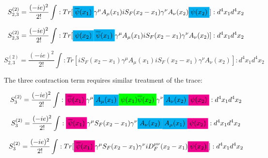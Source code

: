 \documentclass[a4]{article}
\newcommand{\highlight}[2][yellow]{\mathchoice
  {\colorbox{#1}{$\displaystyle#2$}}
  {\colorbox{#1}{$\textstyle#2$}}
  {\colorbox{#1}{$\scriptstyle#2$}}
  {\colorbox{#1}{$\scriptscriptstyle#2$}}}
\begin{document}
        \begin{equation}
            S^{(2)}_{2,3} = \frac{(-ie)^2}{2!} \int :Tr[\highlight[cyan]{\overline{\psi} (x_1)} \gamma^{\mu} A_{\mu} (x_1) i S_{F} (x_2 - x_1) \gamma^{\nu} A_{\nu} (x_2)  \highlight[cyan]{\psi (x_2)}]: d^{4} x_{1} d^{4} x_{2}
        \end{equation}

        \begin{equation}
            S^{(2)}_{2,3} = \frac{(-ie)^2}{2!} \int :Tr[ \highlight[cyan]{\psi (x_2)} \highlight[cyan]{\overline{\psi} (x_1)} \gamma^{\mu} A_{\mu} (x_1) i S_{F} (x_2 - x_1) \gamma^{\nu} A_{\nu} (x_2)]: d^{4} x_{1} d^{4} x_{2}
        \end{equation}

        \begin{framed}
            \begin{equation}
                S^{(2)}_{2,3} = \frac{(-ie)^2}{2!} \int :Tr[ i S_{F} (x_2 - x_1) \gamma^{\mu} A_{\mu} (x_1) i S_{F} (x_2 - x_1) \gamma^{\nu} A_{\nu} (x_2)]: d^{4} x_{1} d^{4} x_{2}
            \end{equation}
        \end{framed}

        The three contraction term requires similar treatment of the trace:

        \begin{equation}
            S^{(2)}_{3} = \frac{(-ie)^2}{2!} \int :\highlight[magenta]{\overline{\psi} (x_1)} \gamma^{\mu} \highlight[cyan]{A_{\mu} (x_1)} \highlight[green]{\psi (x_1) \overline{\psi} (x_2)} \gamma^{\nu} \highlight[cyan]{A_{\nu} (x_2)} \highlight[magenta]{\psi (x_2)}: d^{4} x_{1} d^{4} x_{2}
        \end{equation}

        \begin{equation}
            S^{(2)}_{3} = \frac{(-ie)^2}{2!} \int :\highlight[magenta]{\overline{\psi} (x_1)} \gamma^{\mu} S_{F} (x_2 - x_1) \gamma^{\nu} \highlight[cyan]{A_{\nu} (x_2)} \highlight[cyan]{A_{\mu} (x_1)} \highlight[magenta]{\psi (x_2)}: d^{4} x_{1} d^{4} x_{2}
        \end{equation}

        \begin{equation}
            S^{(2)}_{3} = \frac{(-ie)^2}{2!} \int :Tr[\highlight[magenta]{\overline{\psi} (x_1)} \gamma^{\mu} S_{F} (x_2 - x_1) \gamma^{\nu} i D_{F}^{\mu\nu} (x_2 - x_1) \highlight[magenta]{\psi (x_2)}]: d^{4} x_{1} d^{4} x_{2}
        \end{equation}
\end{document}
